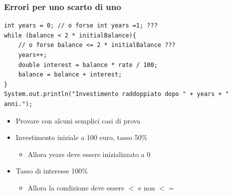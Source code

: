 \begin{frame}[fragile]
\frametitle{Errori per uno scarto di uno}
\begin{lstlisting}
int years = 0; // o forse int years =1; ???
while (balance < 2 * initialBalance){ 
    // o forse balance <= 2 * initialBalance ???
    years++;
    double interest = balance * rate / 100;
    balance = balance + interest;
}
System.out.println("Investimento raddoppiato dopo " + years + " anni.");
\end{lstlisting}
\begin{itemize}
\item Provare con alcuni semplici casi di prova
\item Investimento iniziale a 100 euro, tasso 50\%
\begin{itemize}
\item Allora years deve essere inizializzato a 0
\end{itemize}
\item Tasso di interesse 100\%
\begin{itemize}
\item Allora la condizione deve essere $<$ e non $<=$
\end{itemize}
\end{itemize}
\end{frame}